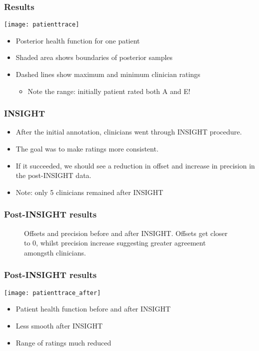 \begin{frame}
	\frametitle{Results}
	\begin{multicols}{2}
	\texttt{[image: patienttrace]}
	\newpage
	\begin{itemize}
		\item Posterior health function for one patient
		\item Shaded area shows boundaries of posterior samples
		\item Dashed lines show maximum and minimum clinician ratings
		\begin{itemize}
			\item Note the range: initially patient rated both A and E!
		\end{itemize}
	\end{itemize}
	\end{multicols}
\end{frame}

\begin{frame}
	\frametitle{INSIGHT}
	\begin{itemize}
		\item After the initial annotation, clinicians went through INSIGHT procedure.
		\item The goal was to make ratings more consistent.
		\item If it succeeded, we should see a reduction in offset and increase in precision in the post-INSIGHT data.
		\item Note: only 5 clinicians remained after INSIGHT
	\end{itemize}
\end{frame}

\begin{frame}
	\frametitle{Post-INSIGHT results}
	\begin{figure}[tbh]
		\hfill
		\centering\caption{\label{fig:clinoffprec}Offsets and precision before and after INSIGHT. Offsets get closer to 0, whilst precision increase suggesting greater agreement amongsth clinicians.}
	\end{figure}
\end{frame}

\begin{frame}
	\frametitle{Post-INSIGHT results}
	\centering\texttt{[image: patienttrace\_after]}
	\begin{itemize}
		\item Patient health function before and after INSIGHT
		\item Less smooth after INSIGHT
		\item Range of ratings much reduced
	\end{itemize}
\end{frame}

